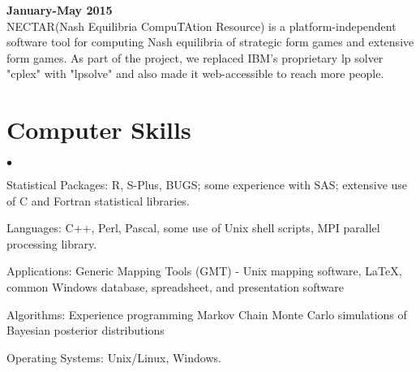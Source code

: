 \documentclass[margin,line]{res}
\newenvironment{list2}{
  \begin{list}{$\bullet$}{%
      \setlength{\itemsep}{0in}
      \setlength{\parsep}{0in} \setlength{\parskip}{0in}
      \setlength{\topsep}{0in} \setlength{\partopsep}{0in} 
      \setlength{\leftmargin}{0.2in}}}{\end{list}}
\begin{document}
\begin{resume}
{\bf }
\hfill {\bf  January-May 2015}\\
NECTAR(Nash Equilibria CompuTAtion Resource) is a platform-independent software tool for computing Nash equilibria of strategic form games and extensive form games. As part of the project, we replaced IBM's proprietary lp solver "cplex" with "lpsolve" and also made it web-accessible to reach more people. 

\section{\sc Computer Skills} 
\begin{list2}
\item Statistical Packages:  R, S-Plus, BUGS; some experience
  with SAS; extensive use of C and Fortran statistical libraries.
\item Languages:  C++, Perl, Pascal, some use of Unix shell scripts,
  MPI parallel processing library.
\item Applications: Generic Mapping Tools (GMT) - Unix mapping software, \LaTeX, common Windows
  database, spreadsheet, and presentation software
\item Algorithms: Experience programming Markov Chain Monte Carlo
  simulations of Bayesian posterior distributions
\item Operating Systems:  Unix/Linux, Windows.\\ 
\end{list2}



\end{resume}
\end{document}
